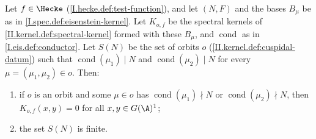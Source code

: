 Let $f\in\Hecke$ (\cref{I.hecke.def:test-function}), and let $(N,F)$ and the bases $B_\mu$ be as in \cref{I.spec.def:eisenstein-kernel}. Let $K_{o,f}$ be the
spectral kernels of \cref{II.kernel.def:spectral-kernel} formed with these $B_\mu$, and $\operatorname{cond}$ as in \cref{I.eis.def:conductor}. Let $S(N)$ be the set of
orbits $o$ (\cref{II.kernel.def:cuspidal-datum}) such that $\operatorname{cond}(\mu_1)\mid N$ and $\operatorname{cond}(\mu_2)\mid N$ for every $\mu=(\mu_1,\mu_2)\in o$. Then:
\begin{enumerate}[label=(\alph*)]
\item if $o$ is an orbit and some $\mu\in o$ has $\operatorname{cond}(\mu_1)\nmid N$ or $\operatorname{cond}(\mu_2)\nmid N$, then $K_{o,f}(x,y)=0$ for all
  $x,y\in G(\A)^1$;
\item the set $S(N)$ is finite.
\end{enumerate}
